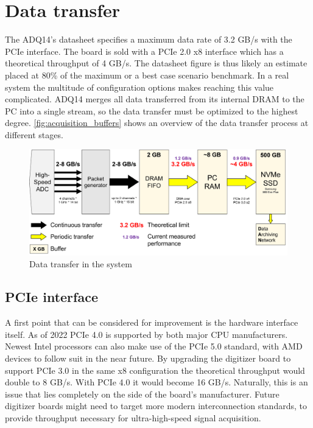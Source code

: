 \section{Data transfer} \label{sec:data_transfer}

The ADQ14's datasheet specifies a maximum data rate of 3.2 GB/s 
with the PCIe interface. The board is sold with a PCIe 2.0 x8 
interface which has a theoretical throughput of 4 GB/s.
The datasheet figure is thus likely an estimate placed at 80\% of 
the maximum or a best case scenario benchmark. In a real system 
the multitude of configuration options makes reaching this value
complicated. ADQ14 merges all data transferred from its internal DRAM 
to the PC into a single stream, so the data transfer must be 
optimized to the highest degree.
\autoref{fig:acquisition_buffers} shows an overview
of the data transfer process at different stages.

\begin{figure}[H]
  \centering
  \includegraphics[width=\linewidth]{media/acquisition_buffers.png}
  \caption{Data transfer in the system}
  \label{fig:acquisition_buffers} 
\end{figure}

\subsection{PCIe interface}

A first point that can be considered for improvement is the hardware interface itself.
As of 2022 PCIe 4.0 is supported by both major CPU manufacturers.
Newest Intel processors can also make use of the PCIe 5.0 standard, 
with AMD devices to follow suit in the near future.
By upgrading the digitizer board to support PCIe 3.0 in the same x8 configuration the
theoretical throughput would double to 8 GB/s. With PCIe 4.0 it would become 16 GB/s.
Naturally, this is an issue that lies completely on the side of the board's manufacturer.
Future digitizer boards might need to target more modern interconnection standards,
to provide throughput necessary for ultra-high-speed signal acquisition.

